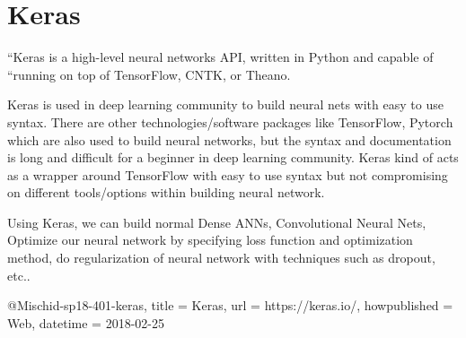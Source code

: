 \section{Keras} 

“Keras is a high-level neural networks API, written in Python and capable of
“running on top of TensorFlow, CNTK, or Theano. \cite{hid-sp18-401-keras}

Keras is used in deep learning community to build neural nets with easy to use
syntax. There are other technologies/software packages like TensorFlow, Pytorch
which are also used to build neural networks, but the syntax and documentation
is long and difficult for a beginner in deep learning community. Keras kind of
acts as a wrapper around TensorFlow with easy to use syntax but not compromising
on different tools/options within building neural network.

Using Keras, we can build normal Dense ANNs, Convolutional Neural Nets, Optimize
our neural network by specifying loss function and optimization method, do
regularization of neural network with techniques such as dropout, etc..


@Misc{hid-sp18-401-keras,
title = {Keras},
url = {https://keras.io/},
howpublished = {Web},
datetime = {2018-02-25}
}


